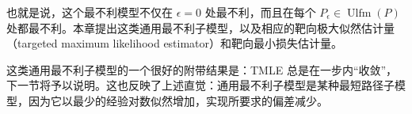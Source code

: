 也就是说，这个最不利模型不仅在 $\epsilon=0$ 处最不利，而且在每个 $P_\epsilon\in\operatorname{Ulfm}(P)$ 处都最不利。本章提出这类通用最不利子模型，以及相应的靶向极大似然估计量（targeted maximum likelihood estimator）和靶向最小损失估计量。

\begin{sourcebox}
这类通用最不利子模型的一个很好的附带结果是：TMLE 总是在一步内“收敛”，下一节将予以说明。这也反映了上述直觉：通用最不利子模型是某种最短路径子模型，因为它以最少的经验对数似然增加，实现所要求的偏差减少。
\end{sourcebox}
